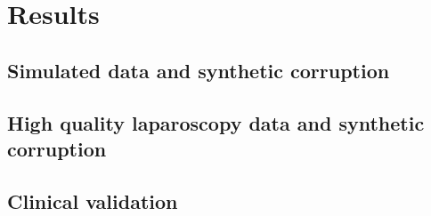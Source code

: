 \chapter{Results}

\section{Simulated data and synthetic corruption}

\section{High quality laparoscopy data and synthetic corruption}

\section{Clinical validation}
